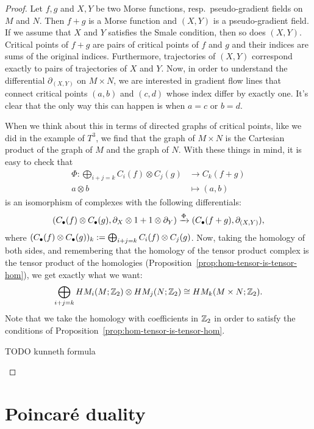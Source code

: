 \begin{proof}
    Let $f, g$ and $X, Y$ be two Morse functions, resp.\ pseudo-gradient fields on  $M$ and  $N$.
    Then $f + g$ is a Morse function and $(X, Y)$ is a pseudo-gradient field. If we assume that $X$ and  $Y$ satisfies the Smale condition, then so does $(X,Y)$.
    Critical points of $f+g$ are pairs of critical points of $f$ and $g$ and their indices are sums of the original indices. 
    Furthermore, trajectories of $(X, Y)$ correspond exactly to pairs of trajectories of $X$ and $Y$.
    Now, in order to understand the differential $\partial_{(X, Y)}$ on $M \times N$, we are interested in gradient flow lines that connect critical points $(a,b)$ and  $(c,d)$ whose index differ by exactly one.
    It's clear that the only way this can happen is when $a = c$ or $b = d$.

    When we think about this in terms of directed graphs of critical points, like we did in the example of $T^{3}$, we find that the graph of $M \times N$ is the Cartesian product of the graph of $M$ and the graph of  $N$.
    With these things in mind, it is easy to check that
    \begin{align*}
        \Phi: \bigoplus_{i+j = k} C_i(f) \otimes C_j(g) &\longrightarrow C_k(f+g) \\
        a \otimes b &\longmapsto (a,b)
    \end{align*}
    is an isomorphism of complexes with the following differentials:
    \[
        (C_\bul(f) \otimes C_\bul(g), \partial_X \otimes 1 + 1 \otimes \partial_Y) \xrightarrow{\Phi}   (C_\bul(f+g), \partial_{(X,Y)})
    ,\] 
    where $(C_\bul(f) \otimes C_\bul(g))_k := \bigoplus_{i+j = k} C_i(f) \otimes C_j(g)$.
    Now, taking the homology of both sides, and remembering that the homology of the tensor product complex is the tensor product of the homologies (Proposition~\ref{prop:hom-tensor-is-tensor-hom}), we get exactly what we want:
    \[
        \bigoplus_{i+j = k} \HMf[i]{M; \Z_2} \otimes \HMf[j]{N; \Z_2} \cong \HMf[k]{M \times N; \Z_2}
    .\] 
    Note that we take the homology with coefficients in $\Z_2$ in order to satisfy the conditions of Proposition~\ref{prop:hom-tensor-is-tensor-hom}.
\begin{marginfigure}
    \centering
    \caption{TODO kunneth formula}
    \label{fig:kunneth-formula}
\end{marginfigure}
\end{proof}

\section{Poincaré duality}
